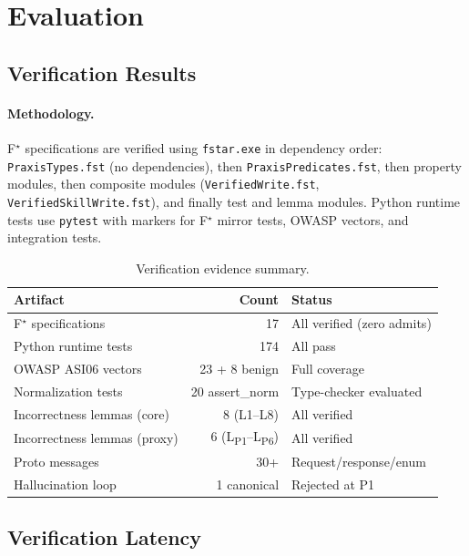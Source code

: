 \documentclass[sigplan,screen,nonacm]{acmart}
\newcommand{\fstar}{F\ensuremath{^\star}}
\begin{document}
\section{Evaluation}
\label{sec:evaluation}

\subsection{Verification Results}

\paragraph{Methodology.}
\fstar{} specifications are verified using \texttt{fstar.exe} in dependency
order: \texttt{PraxisTypes.fst} (no dependencies), then
\texttt{PraxisPredicates.fst}, then property modules, then composite
modules (\texttt{VerifiedWrite.fst}, \texttt{VerifiedSkillWrite.fst}), and
finally test and lemma modules. Python runtime tests use \texttt{pytest}
with markers for \fstar{} mirror tests, OWASP vectors, and integration
tests.

\begin{table}[t]
\caption{Verification evidence summary.}
\label{tab:results}
\small
\begin{tabular}{@{}lrl@{}}
\toprule
\textbf{Artifact} & \textbf{Count} & \textbf{Status} \\
\midrule
\fstar{} specifications    & 17 & All verified (zero admits) \\
Python runtime tests        & 174 & All pass \\
OWASP ASI06 vectors         & 23 + 8 benign & Full coverage \\
Normalization tests         & 20 assert\_norm & Type-checker evaluated \\
Incorrectness lemmas (core) & 8 (L1--L8) & All verified \\
Incorrectness lemmas (proxy) & 6 (L\textsubscript{P1}--L\textsubscript{P6}) & All verified \\
Proto messages              & 30+ & Request/response/enum \\
Hallucination loop          & 1 canonical & Rejected at P1 \\
\bottomrule
\end{tabular}
\end{table}

\subsection{Verification Latency}
\end{document}
